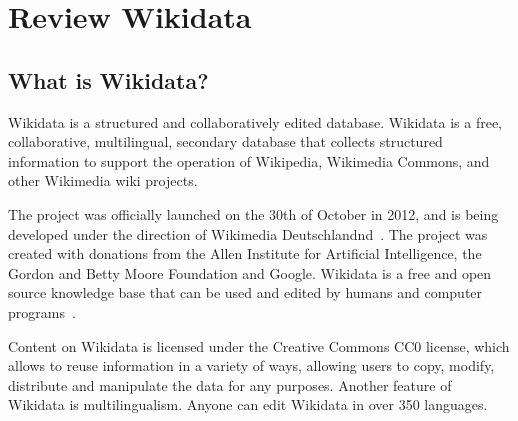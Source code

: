 \setchapterpreamble[u]{\margintoc}
\chapter{Review Wikidata}
\label{ch:review-wd}


\section{What is Wikidata?}
Wikidata is a structured and collaboratively edited database. Wikidata is a free, collaborative, multilingual, secondary database that collects structured information to support the operation of Wikipedia, Wikimedia Commons, and other Wikimedia wiki projects. 

The project was officially launched on the 30th of October in 2012, and is being developed under the direction of Wikimedia Deutschlandnd~. The project was created with donations from the Allen Institute for Artificial Intelligence, the Gordon and Betty Moore Foundation and Google. Wikidata is a free and open source knowledge base that can be used and edited by humans and computer programs~.

Content on Wikidata is licensed under the Creative Commons CC0 license, which allows to reuse information in a variety of ways, allowing users to copy, modify, distribute and manipulate the data for any purposes. Another feature of Wikidata is multilingualism. Anyone can edit Wikidata in over 350 languages.


